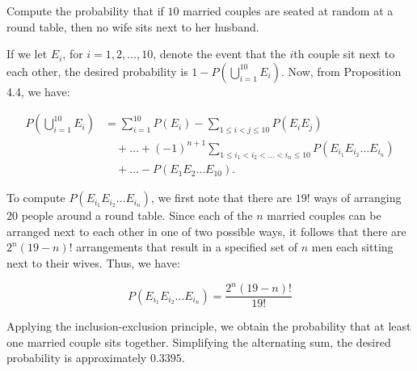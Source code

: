                     \begin{example}
                        Compute the probability that if \(10\) married couples are seated at random at a round table, then no wife sits next to her husband.
                    \end{example}
                        
                        \begin{solution}
                        If we let \(E_i\), for \(i = 1, 2, \ldots, 10\), denote the event that the \(i\)th couple sit next to each other, the desired probability is \(1 - P\left( \bigcup_{i=1}^{10} E_i \right)\). Now, from Proposition 4.4, we have:
                        
                        \begin{align*}
                            P\left( \bigcup_{i=1}^{10} E_i \right) &= \sum_{i=1}^{10} P(E_i) - \sum_{1 \leq i < j \leq 10} P(E_i E_j) \\
                            &\quad + \ldots + (-1)^{n+1} \sum_{1 \leq i_1 < i_2 < \ldots < i_n \leq 10} P(E_{i_1} E_{i_2} \ldots E_{i_n}) \\
                            &\quad + \ldots - P(E_1 E_2 \ldots E_{10}).
                        \end{align*}
                          
                        
                        To compute \(P(E_{i_1} E_{i_2} \ldots E_{i_n})\), we first note that there are \(19!\) ways of arranging \(20\) people around a round table. Since each of the \(n\) married couples can be arranged next to each other in one of two possible ways, it follows that there are \(2^n (19 - n)!\) arrangements that result in a specified set of \(n\) men each sitting next to their wives. Thus, we have:
                        
                        \[
                        P(E_{i_1} E_{i_2} \ldots E_{i_n}) = \frac{2^n (19 - n)!}{19!}
                        \]
                        
                        Applying the inclusion-exclusion principle, we obtain the probability that at least one married couple sits together. Simplifying the alternating sum, the desired probability is approximately \(0.3395\).
                    \end{solution}
                        
                


    


















